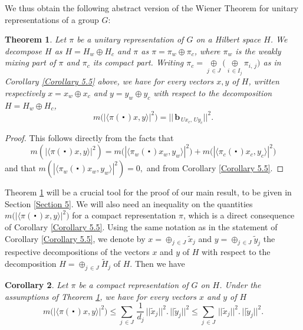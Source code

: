 \documentclass[11pt,english,a4paper]{smfart}
\numberwithin{equation}{section}
\newtheorem{theorem}{Theorem}[section]
\newtheorem{corollary}[theorem]{Corollary}
\theoremstyle{definition}
\begin{document}
We thus obtain the following abstract version of the Wiener Theorem for 
unitary representations of a group $G$:
\begin{theorem}\label{Theorem 5.6}
 Let $\pi $ be a unitary representation of $G$ on a Hilbert 
space $H$. 
We decompose $H$ as $H=H_{w}{\mathop{\oplus}} H_{c}$ and $\pi$ as $\pi =\pi _{w}{\mathop{\oplus}} \pi _{c}$, where 
$\pi_{w}$ is the weakly mixing part of $\pi $ and $\pi 
_{c}$ its compact part. Writing $\pi 
_{c}={\mathop{\oplus}}\limits_{j\,\in J}\bigl({\mathop{\oplus}}\limits_{i\,\in I_{j}}\pi {_{i,\,j}} 
\bigr)$ as in Corollary \ref{Corollary 5.5} above, we have for every 
vectors $x,y$ of $H$, written respectively $x=x_{w}{\mathop{\oplus}} x_{c}$ and $y=y_{w}{\mathop{\oplus}} y_{c}$ with respect to the decomposition $H=H_{w}{\mathop{\oplus}} H_{c}$,
\begin{equation}\label{Eq4}
 m\bigl(|{\ensuremath{{\langle {\pi (\,\centerdot\,)x},{y}\rangle}}}|^{2} 
\bigr)=||\,\pmb{b}_{\,Ux_{c},\,Uy_{c}}||^{2}.
\end{equation}
\end{theorem}
\begin{proof}
 This follows directly from the facts that
\[
m(|{\ensuremath{{\langle {\pi (\,\centerdot\,)x},{y}\rangle}}}|^{2})=
m\bigl(|{\ensuremath{{\langle {\pi_{w} (\,\centerdot\,)x_{w}},{y_{w}}\rangle}}}|^{2} 
\bigr)+m\bigl(|{\ensuremath{{\langle {\pi_{c} (\,\centerdot\,)x_{c}},{y_{c}}\rangle}}}|^{2} 
\bigr)
\] and that
$m(|{\ensuremath{{\langle {\pi_{w} (\,\centerdot\,)x_{w}},{y_{w}}\rangle}}}|^{2})=0,$
and from Corollary \ref{Corollary 5.5}.
\end{proof}
\par 
Theorem \ref{Theorem 5.6} will be a crucial tool for the proof of our main 
result, to be given in Section \ref{Section 5}. We will also need an 
inequality on the quantities $m\bigl(|{\ensuremath{{\langle {\pi (\,\centerdot\,)x},{y}\rangle}}}|^{2} 
\bigr)$ for a compact representation $\pi$, which is a direct consequence of Corollary \ref{Corollary 5.5}. Using the same notation as in the statement of Corollary \ref{Corollary 5.5}, we
denote by $x={\mathop{\oplus}}_{j\,\in J}{\widetilde{{x}}}_{j}$ and $y={\mathop{\oplus}}_{j\,\in J}{\widetilde{{y}}}_{j}$ the 
respective decompositions of the vectors $x$ and $y$ of $H$ with respect 
to the decomposition $H={\mathop{\oplus}}_{j\,\in J}{\widetilde{{H}}}_{j}$ of $H$. Then we have
\begin{corollary}\label{Corollary 5.7}
Let $\pi$ be a compact representation of $G$ on $H$.
 Under the assumptions of Theorem \ref{Theorem 5.6}, we have for every 
vectors $x$ and $y$ of $H$
\[
m\bigl(|{\ensuremath{{\langle {\pi (\,\centerdot\,)x},{y}\rangle}}}|^{2} 
\bigr)\le\sum_{j\,\in J}\,\dfrac{1}{{d_{j}}}\, ||{\widetilde{{x}}}_{j}||^{2}.\,||{\widetilde{{y}}}_{j}||^{2}\le\sum_{j\,\in J}\, ||{\widetilde{{x}}}_{j}||^{2}.\,||{\widetilde{{y}}}_{j}||^{2}.
\]
\end{corollary}
\end{document}
